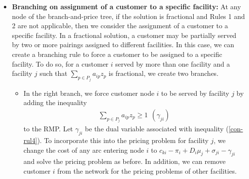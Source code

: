 \begin {itemize}

\item[{\bf Rule 3}]
  {\bf Branching on assignment of a customer to a specific facility:} 
  At any node of the branch-and-price tree, if the solution is fractional and Rules 1 and 2 are not 
  applicable, then we consider the assignment of a customer to a specific facility. 
  In a fractional solution, a customer may be partially served by two or more pairings assigned 
  to different facilities. In this case, we can create a branching rule to force a customer to 
  be assigned to a specific facility. To do so, for a customer $i$ served by more than one 
  facility and a facility $j$ such that $\sum_{p \in P_j }a_{ip} z_{p}$ is fractional, we create 
  two branches. 

  \begin{itemize}
  \item In the right branch, we force customer node $i$ to be served by facility $j$ by adding 
    the inequality
    \begin{eqnarray}
      \label{con-rul4}
      \sum_{p \in P_j}a_{ip}z_{p} \geq  1 \ \ (\gamma_{ji})
    \end{eqnarray}       
    to the RMP. Let $\gamma_{ji}$ be the dual variable associated with inequality (\ref{con-rul4}).  
    To incorporate this into the pricing problem for facility $j$, we change the cost of any arc 
    entering node $i$ to $c_{ki}-\pi_{i}+D_i \mu_j +\sigma_{ji}-\gamma_{ji}$ and solve the pricing 
    problem as before. In addition, we can remove customer $i$ from the network for the pricing
    problems of other facilities.
    

\end{itemize}
\end{itemize}
